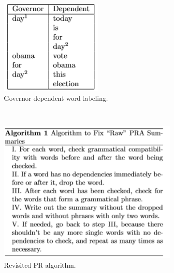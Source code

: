 \documentclass[runningheads]{llncs}
\begin{document}
\begin{figure}
    \centering
    \begin{subfigure}[b]{0.4\textwidth}
        \includegraphics[width=\textwidth]{fig6.png}
        \caption{Governor dependent word labeling.}
        \label{fig:fig6}
    \end{subfigure}
    ~
    \begin{subfigure}[b]{0.4\textwidth}
        \includegraphics[width=\textwidth]{fig7.png}
        \caption{Revisited PR algorithm.}
        \label{fig:fig7}
    \end{subfigure}
    \caption{\cite{judd_better_2013}}
\end{figure}
\end{document}
